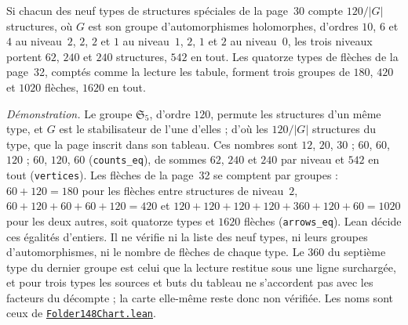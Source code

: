 \begin{encadre}
\begin{enonce}
Si chacun des neuf types de structures spéciales de la page~30 compte $120/|G|$ structures, où $G$ est son groupe d'automorphismes holomorphes, d'ordres $10$, $6$ et $4$ au niveau~$2$, $2$, $2$ et $1$ au niveau~$1$, $2$, $1$ et $2$ au niveau~$0$, les trois niveaux portent $62$, $240$ et $240$ structures, $542$ en tout. Les quatorze types de flèches de la page~32, comptés comme la lecture les tabule, forment trois groupes de $180$, $420$ et $1020$ flèches, $1620$ en tout.
\end{enonce}
\end{encadre}
{\small \emph{Démonstration.} Le groupe $\mathfrak S_5$, d'ordre $120$, permute les structures d'un même type, et $G$ est le stabilisateur de l'une d'elles ; d'où les $120/|G|$ structures du type, que la page inscrit dans son tableau. Ces nombres sont $12$, $20$, $30$ ; $60$, $60$, $120$ ; $60$, $120$, $60$ (\texttt{counts\_eq}), de sommes $62$, $240$ et $240$ par niveau et $542$ en tout (\texttt{vertices}). Les flèches de la page~32 se comptent par groupes : $60 + 120 = 180$ pour les flèches entre structures de niveau~$2$, $60 + 120 + 60 + 60 + 120 = 420$ et $120 + 120 + 120 + 120 + 360 + 120 + 60 = 1020$ pour les deux autres, soit quatorze types et $1620$ flèches (\texttt{arrows\_eq}). Lean décide ces égalités d'entiers. Il ne vérifie ni la liste des neuf types, ni leurs groupes d'automorphismes, ni le nombre de flèches de chaque type. Le $360$ du septième type du dernier groupe est celui que la lecture restitue sous une ligne surchargée, et pour trois types les sources et buts du tableau ne s'accordent pas avec les facteurs du décompte ; la carte elle-même reste donc non vérifiée. Les noms sont ceux de \href{\leanblobmain/Combinatorics/Folder148Chart.lean}{\texttt{Folder148Chart.\allowbreak{}lean}}.\par}

